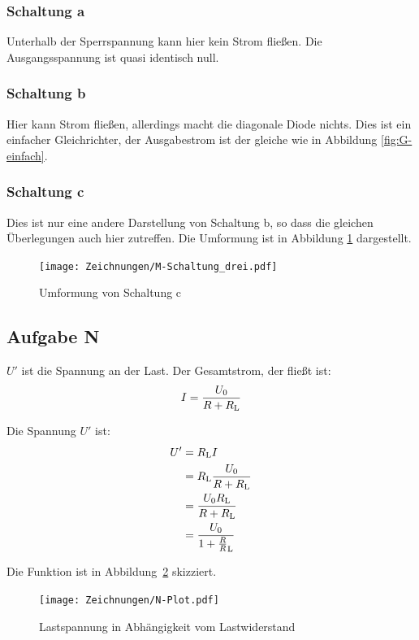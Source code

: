 \subsubsection{Schaltung a}

Unterhalb der Sperrspannung kann hier kein Strom fließen. Die Ausgangsspannung
ist quasi identisch null.

\subsubsection{Schaltung b}

Hier kann Strom fließen, allerdings macht die diagonale Diode nichts. Dies ist
ein einfacher Gleichrichter, der Ausgabestrom ist der gleiche wie in Abbildung
\ref{fig:G-einfach}.

\subsubsection{Schaltung c}

Dies ist nur eine andere Darstellung von Schaltung b, so dass die gleichen
Überlegungen auch hier zutreffen. Die Umformung ist in Abbildung
\ref{fig:M-Schaltung_drei} dargestellt.

\begin{figure}[h]
	\centering
	\caption{%
		Umformung von Schaltung c
	}
	\label{fig:M-Schaltung_drei}
	\texttt{[image: Zeichnungen/M-Schaltung\_drei.pdf]}
\end{figure}

\subsection{Aufgabe N}

$U'$ ist die Spannung an der Last. Der Gesamtstrom, der fließt ist:
\[
	I = \frac{U_0}{R + R_\text L}
\]

\newcommand\RL{R_\text L}

Die Spannung $U'$ ist:
\begin{align*}
	U'
	&= \RL I \\
	&= \RL \frac{U_0}{R + R_\text L} \\
	&= \frac{U_0 \RL}{R + \RL} \\
	&= \frac{U_0}{1 + \frac R\RL}
\end{align*}

Die Funktion ist in Abbildung~\ref{fig:N-Plot} skizziert.

\begin{figure}[h]
	\centering
	\caption{%
		Lastspannung in Abhängigkeit vom Lastwiderstand
	}
	\label{fig:N-Plot}
	\texttt{[image: Zeichnungen/N-Plot.pdf]}
\end{figure}

